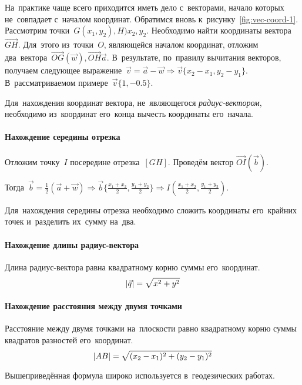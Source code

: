 \documentclass[]{scrartcl}
\begin{document}
На~практике чаще всего приходится иметь дело с~векторами, начало которых не~совпадает с~началом координат. Обратимся вновь к~рисунку~\ref{fig:vec-coord-1}. Рассмотрим точки~${\textstyle G(x_1,y_2),H)x_2,y_2}$. Необходимо найти координаты вектора~${\textstyle \vec{GH}}$. Для~этого из~точки~${\textstyle O}$, являющейся началом координат, отложим два~вектора~${\textstyle \vec{OG}(\vec{w}),\vec{OH}\vec{a}}$. В~результате, по~правилу вычитания векторов, получаем следующее выражение~${\textstyle \vec{v}=\vec{a}-\vec{w} \Rightarrow \vec{v}\{x_{2}-x_{1},y_{2}-y_{1}\}}$. В~рассматриваемом примере~${\textstyle \vec{v}\{1,-0.5\}}$.
\begin{proposition}
	Для~нахождения координат вектора, не~являющегося \emph{радиус-вектором}, необходимо из~координат его~конца вычесть координаты его~начала. 
\end{proposition}
\paragraph{Нахождение середины отрезка}
Отложим точку~${\textstyle I}$ посередине отрезка~${\textstyle [GH]}$. Проведём вектор ${\textstyle \vec{OI}(\vec{b})}$.

Тогда~${\textstyle \vec{b}=\frac{1}{2}(\vec{a}+\vec{w}) \Rightarrow \vec{b} \{\frac{x_1+x_2}{2},\frac{y_1+y_2}{2}\} \Rightarrow I(\frac{x_1+x_2}{2},\frac{y_1+y_2}{2})}$.  
\begin{proposition}
	Для~нахождения середины отрезка необходимо сложить координаты его~крайних точек и~разделить их~сумму на~два.
\end{proposition}
\paragraph{Нахождение длины радиус-вектора}
\begin{proposition}
	Длина радиус-вектора равна квадратному корню суммы его~координат.
	\begin{equation}\label{eq:radius-vector-lenght}
	\arrowvert \vec{q} \arrowvert=\sqrt{x^{2}+y^{2}}
	\end{equation}
\end{proposition}
\paragraph{Нахождение расстояния между двумя точками}
\begin{proposition}
	Расстояние между двумя точками на~плоскости равно квадратному корню суммы квадратов разностей его~координат.
	\begin{equation}\label{eq:two-points-distance}
	\arrowvert AB \arrowvert = \sqrt{(x_{2}-x_{1})^{2}+(y_{2}-y_{1})^{2}}
	\end{equation}
\end{proposition}
Вышеприведённая формула широко используется в~геодезических работах.
\end{document}
